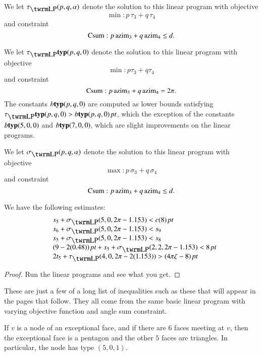 \bigskip

We let $\tauLP(p,q,\alpha)$ denote the solution to this linear
program with objective $$\min: p\, \tau_3 + q\, \tau_4$$ and
constraint
$${\operatorname{Csum}}: p\, {\operatorname{azim}}_3 + q\,{\operatorname{azim}}_4 \le d.$$

We let $\tlp\pqr{(p,q,0)}$ denote the solution to this linear program with
objective $$\min: p \tau_3 + q \tau_4$$ and constraint
$${\operatorname{Csum}}: p\, {\operatorname{azim}}_3 + q\,{\operatorname{azim}}_4 =2\pi.$$  The constants $b{\operatorname{\bf typ}}{(p,q,0)}$
are computed as lower bounds satisfying $\tlp\pqr{(p,q,0)} > b\pqr{(p,q,0)}\,\pt$,
which the exception of the constants $b{\operatorname{\bf typ}}{(5,0,0)}$ and $b{\operatorname{\bf typ}}{(7,0,0)}$, which
are slight improvements on the linear programs.

We let $\sLP(p,q,\alpha)$ denote the solution to this linear program
with objective $$\max: p\, \sigma_3 + q\, \sigma_4$$ and constraint
$${\operatorname{Csum}}: p\, {\operatorname{azim}}_3 + q\,{\operatorname{azim}}_4 \le d.$$



\begin{lemma} We have the following estimates:
    $$
    \begin{array}{lll}
    &s_5+\sLP(5,0,2\pi-1.153)< c(8)\,\pt\\
    &s_6+\sLP(5,0,2\pi-1.153) < s_9\\
    &s_5+\sLP(5,0,2\pi-1.153)<s_8\\
    &(9-2(0.48))\,\pt+s_5+\sLP(2,2,2\pi-1.153)<8\,\pt\\
    &2t_5+\tauLP(4,0,2\pi-2(1.153))>\squander\\
    \end{array}
    $$
\end{lemma}

\begin{proof} Run the linear programs and see what you get.
\end{proof}

These are just a few of a long list of inequalities such as these
that will appear in the pages that follow.  They all come from the
same basic linear program with varying objective function and angle
sum constraint.



\begin{lemma}  If $v$  is a node of an exceptional face,
and if there are $6$ faces meeting at $v$, then the exceptional face
is a pentagon and the other $5$ faces are triangles.  In particular,
the node has type $(5,0,1)$.
\end{lemma}

